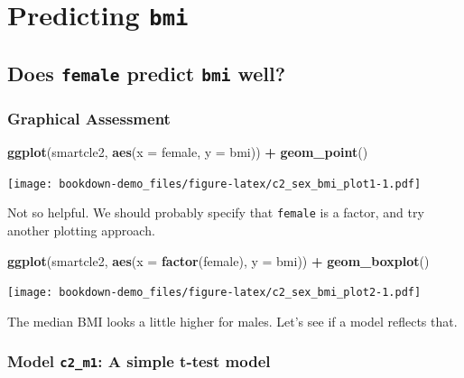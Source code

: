 \documentclass[]{book}
\newenvironment{Shaded}{\begin{snugshade}}{\end{snugshade}}
\newcommand{\KeywordTok}[1]{\textcolor[rgb]{0.13,0.29,0.53}{\textbf{#1}}}
\newcommand{\DataTypeTok}[1]{\textcolor[rgb]{0.13,0.29,0.53}{#1}}
\newcommand{\StringTok}[1]{\textcolor[rgb]{0.31,0.60,0.02}{#1}}
\newcommand{\OperatorTok}[1]{\textcolor[rgb]{0.81,0.36,0.00}{\textbf{#1}}}
\newcommand{\NormalTok}[1]{#1}
\theoremstyle{definition}
\theoremstyle{definition}
\theoremstyle{definition}
\theoremstyle{remark}
\begin{document}
\section{\texorpdfstring{Predicting
\texttt{bmi}}{Predicting bmi}}\label{predicting-bmi}

\subsection{\texorpdfstring{Does \texttt{female} predict \texttt{bmi}
well?}{Does female predict bmi well?}}\label{does-female-predict-bmi-well}

\subsubsection{Graphical Assessment}\label{graphical-assessment}

\begin{Shaded}
\begin{Highlighting}[]
\KeywordTok{ggplot}\NormalTok{(smartcle2, }\KeywordTok{aes}\NormalTok{(}\DataTypeTok{x =}\NormalTok{ female, }\DataTypeTok{y =}\NormalTok{ bmi)) }\OperatorTok{+}
\StringTok{    }\KeywordTok{geom_point}\NormalTok{()}
\end{Highlighting}
\end{Shaded}

\texttt{[image: bookdown-demo\_files/figure-latex/c2\_sex\_bmi\_plot1-1.pdf]}

Not so helpful. We should probably specify that \texttt{female} is a
factor, and try another plotting approach.

\begin{Shaded}
\begin{Highlighting}[]
\KeywordTok{ggplot}\NormalTok{(smartcle2, }\KeywordTok{aes}\NormalTok{(}\DataTypeTok{x =} \KeywordTok{factor}\NormalTok{(female), }\DataTypeTok{y =}\NormalTok{ bmi)) }\OperatorTok{+}
\StringTok{    }\KeywordTok{geom_boxplot}\NormalTok{()}
\end{Highlighting}
\end{Shaded}

\texttt{[image: bookdown-demo\_files/figure-latex/c2\_sex\_bmi\_plot2-1.pdf]}

The median BMI looks a little higher for males. Let's see if a model
reflects that.

\subsubsection{\texorpdfstring{Model \texttt{c2\_m1}: A simple t-test
model}{Model c2\_m1: A simple t-test model}}\label{model-c2_m1-a-simple-t-test-model}
\end{document}
